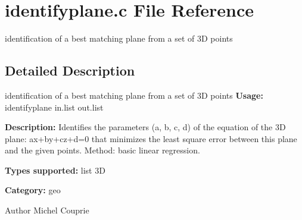 \section{identifyplane.c File Reference}
\label{identifyplane_8c}


identification of a best matching plane from a set of 3D points  




\subsection{Detailed Description}
identification of a best matching plane from a set of 3D points {\bfseries Usage:} identifyplane in.list out.list

{\bfseries Description:} Identifies the parameters (a, b, c, d) of the equation of the 3D plane: ax+by+cz+d=0 that minimizes the least square error between this plane and the given points. Method: basic linear regression.

{\bfseries Types supported:} list 3D

{\bfseries Category:} geo

\begin{DoxyAuthor}{Author}
Michel Couprie 
\end{DoxyAuthor}
